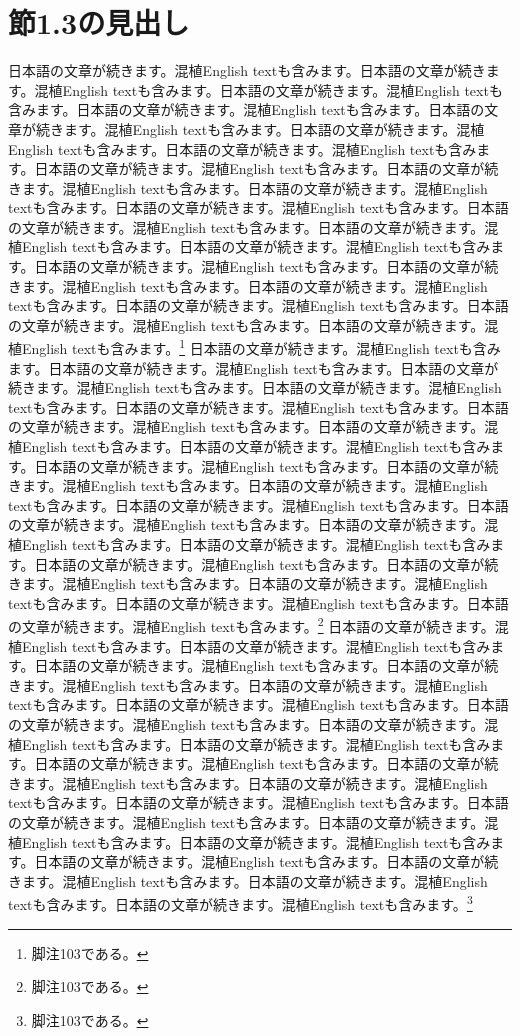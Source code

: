 \documentclass[pdflatex,book]{jlreq}
\begin{document}
\section{節1.3の見出し}
日本語の文章が続きます。混植English textも含みます。日本語の文章が続きます。混植English textも含みます。日本語の文章が続きます。混植English textも含みます。日本語の文章が続きます。混植English textも含みます。日本語の文章が続きます。混植English textも含みます。日本語の文章が続きます。混植English textも含みます。日本語の文章が続きます。混植English textも含みます。日本語の文章が続きます。混植English textも含みます。日本語の文章が続きます。混植English textも含みます。日本語の文章が続きます。混植English textも含みます。日本語の文章が続きます。混植English textも含みます。日本語の文章が続きます。混植English textも含みます。日本語の文章が続きます。混植English textも含みます。日本語の文章が続きます。混植English textも含みます。日本語の文章が続きます。混植English textも含みます。日本語の文章が続きます。混植English textも含みます。日本語の文章が続きます。混植English textも含みます。日本語の文章が続きます。混植English textも含みます。日本語の文章が続きます。混植English textも含みます。日本語の文章が続きます。混植English textも含みます。\footnote{脚注103である。}
日本語の文章が続きます。混植English textも含みます。日本語の文章が続きます。混植English textも含みます。日本語の文章が続きます。混植English textも含みます。日本語の文章が続きます。混植English textも含みます。日本語の文章が続きます。混植English textも含みます。日本語の文章が続きます。混植English textも含みます。日本語の文章が続きます。混植English textも含みます。日本語の文章が続きます。混植English textも含みます。日本語の文章が続きます。混植English textも含みます。日本語の文章が続きます。混植English textも含みます。日本語の文章が続きます。混植English textも含みます。日本語の文章が続きます。混植English textも含みます。日本語の文章が続きます。混植English textも含みます。日本語の文章が続きます。混植English textも含みます。日本語の文章が続きます。混植English textも含みます。日本語の文章が続きます。混植English textも含みます。日本語の文章が続きます。混植English textも含みます。日本語の文章が続きます。混植English textも含みます。日本語の文章が続きます。混植English textも含みます。日本語の文章が続きます。混植English textも含みます。\footnote{脚注103である。}
日本語の文章が続きます。混植English textも含みます。日本語の文章が続きます。混植English textも含みます。日本語の文章が続きます。混植English textも含みます。日本語の文章が続きます。混植English textも含みます。日本語の文章が続きます。混植English textも含みます。日本語の文章が続きます。混植English textも含みます。日本語の文章が続きます。混植English textも含みます。日本語の文章が続きます。混植English textも含みます。日本語の文章が続きます。混植English textも含みます。日本語の文章が続きます。混植English textも含みます。日本語の文章が続きます。混植English textも含みます。日本語の文章が続きます。混植English textも含みます。日本語の文章が続きます。混植English textも含みます。日本語の文章が続きます。混植English textも含みます。日本語の文章が続きます。混植English textも含みます。日本語の文章が続きます。混植English textも含みます。日本語の文章が続きます。混植English textも含みます。日本語の文章が続きます。混植English textも含みます。日本語の文章が続きます。混植English textも含みます。日本語の文章が続きます。混植English textも含みます。\footnote{脚注103である。}
\end{document}

